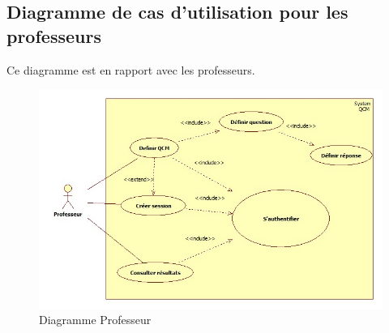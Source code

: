\documentclass[10pt,a4paper,titlepage]{report}
\begin{document}
	\subsection{Diagramme de cas d'utilisation pour les professeurs}
	Ce diagramme est en rapport avec les professeurs.
	\begin{figure}[h!]
		\caption{Diagramme Professeur}
		\centering
		\includegraphics[scale=0.5]{Include/Professeur.jpg}
\end{figure}
\end{document}
